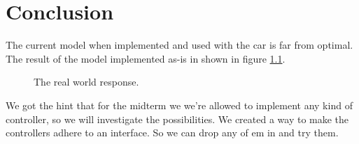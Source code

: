 \documentclass[final]{scrreprt} %
\begin{document}
\chapter{Conclusion}
\label{ch:mod3-con}
The current model when implemented and used with the car is far from optimal.
The result of the model implemented as-is in shown in figure \ref{fig:real-world-response}.
\begin{figure}[H]
	\centering
    	\setlength\figureheight{4cm}
    	\setlength{}
    	    	
    	\caption{The real world response.}
    	\label{fig:real-world-response}
\end{figure}
We got the hint that for the midterm we we're allowed to implement any kind of controller, so we will investigate the possibilities.
We created a way to make the controllers adhere to an interface.
So we can drop any of em in and try them.
\end{document}
